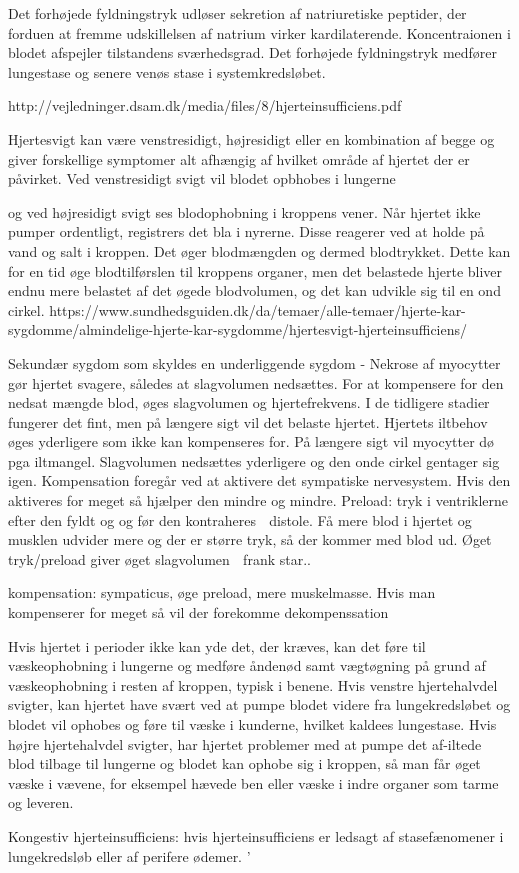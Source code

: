 Det forhøjede fyldningstryk udløser sekretion af natriuretiske peptider,  der forduen at fremme udskillelsen af natrium virker kardilaterende. Koncentraionen i blodet afspejler tilstandens sværhedsgrad.  Det forhøjede fyldningstryk medfører lungestase og senere venøs stase i systemkredsløbet. 

http://vejledninger.dsam.dk/media/files/8/hjerteinsufficiens.pdf

Hjertesvigt kan være venstresidigt, højresidigt eller en kombination af begge og giver forskellige symptomer alt afhængig af hvilket område af hjertet der er påvirket. Ved venstresidigt svigt vil blodet opbhobes i lungerne 


og ved højresidigt svigt ses blodophobning i kroppens vener. Når hjertet ikke pumper ordentligt, registrers det bla i nyrerne. Disse reagerer ved at holde på vand og salt i kroppen. Det øger blodmængden og dermed blodtrykket. Dette kan for en tid øge blodtilførslen til kroppens organer, men det belastede hjerte bliver endnu mere belastet af det øgede blodvolumen, og det kan udvikle sig til en ond cirkel. https://www.sundhedsguiden.dk/da/temaer/alle-temaer/hjerte-kar-sygdomme/almindelige-hjerte-kar-sygdomme/hjertesvigt-hjerteinsufficiens/ 




Sekundær sygdom som skyldes en underliggende sygdom
-	Nekrose af myocytter gør hjertet svagere, således at slagvolumen nedsættes. 
For at kompensere for den nedsat mængde blod, øges slagvolumen og hjertefrekvens. I de tidligere stadier fungerer det fint, men på længere sigt vil det belaste hjertet.  Hjertets iltbehov øges yderligere som ikke kan kompenseres for. På længere sigt vil myocytter dø pga iltmangel. Slagvolumen nedsættes yderligere og den onde cirkel gentager sig igen. 
Kompensation foregår ved at aktivere det sympatiske nervesystem. Hvis den aktiveres for meget så hjælper den mindre og mindre. 
Preload: tryk i ventriklerne efter den fyldt og og før den kontraheres  distole. Få mere blod i hjertet og musklen udvider mere og der er større tryk, så der kommer med blod ud. Øget tryk/preload giver øget slagvolumen  frank star..

kompensation: sympaticus, øge preload, mere muskelmasse. 
Hvis man kompenserer for meget så vil der forekomme dekompenssation




Hvis hjertet i perioder ikke kan yde det, der kræves, kan det føre til væskeophobning i lungerne og medføre åndenød samt vægtøgning på grund af væskeophobning i resten af kroppen, typisk i benene. 
Hvis venstre hjertehalvdel svigter, kan hjertet have svært ved at pumpe blodet videre fra lungekredsløbet og blodet vil ophobes og føre til væske i kunderne, hvilket kaldees lungestase.
Hvis højre hjertehalvdel svigter, har hjertet problemer med at pumpe det af-iltede blod tilbage til lungerne og blodet kan ophobe sig i kroppen, så man får øget væske i vævene, for eksempel hævede ben eller væske i indre organer som tarme og leveren. 


Kongestiv hjerteinsufficiens: hvis hjerteinsufficiens er ledsagt af stasefænomener i lungekredsløb eller af perifere ødemer. ’




\cite{Martini2015}